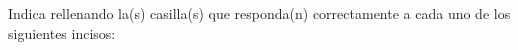 Indica rellenando la(s) casilla(s) que responda(n) correctamente a cada uno de los siguientes incisos:

\begin{parts}
    { \printanswers
        
    }
    
\end{parts}